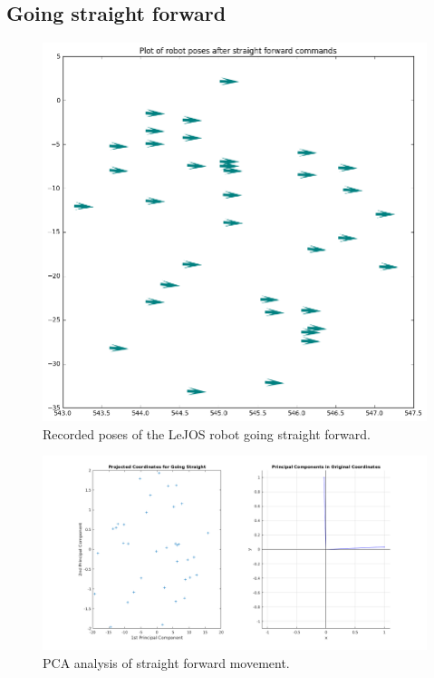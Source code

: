 \documentclass[paper=a4, fontsize=11pt]{scrartcl} %
\begin{document}
    \subsection{Going straight forward}
    \begin{figure}[h!]
        \begin{center}
            \setlength{\fboxsep}{0.5pt} %
            \setlength{\fboxrule}{0.5pt}
            \includegraphics[width=0.7\linewidth,fbox]{images/poses_plot_1_straight.png}
            \caption{Recorded poses of the LeJOS robot going straight forward.}
        \end{center}
    \end{figure}
    \begin{figure}[h!]
        \begin{center}
            \setlength{\fboxsep}{0.5pt} %
            \setlength{\fboxrule}{0.5pt}
            \includegraphics[width=\linewidth,fbox]{images/pca_straight.png}
            \caption{PCA analysis of straight forward movement.}
        \end{center}
    \end{figure}
\end{document}
